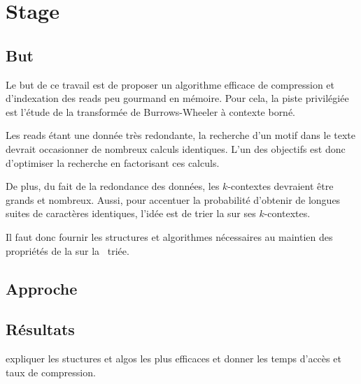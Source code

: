 \section{Stage}

\subsection{But}
Le but de ce travail est de proposer un algorithme efficace de compression et d'indexation des reads peu gourmand en mémoire. Pour cela, la piste privilégiée est l'étude de la transformée de Burrows-Wheeler à contexte borné. 

Les reads étant une donnée très redondante, la recherche d'un motif dans le texte devrait occasionner de nombreux calculs identiques. L'un des objectifs est donc d'optimiser la recherche en factorisant ces calculs. 

De plus, du fait de la redondance des données, les $k$-contextes devraient être grands et nombreux. Aussi, pour accentuer la probabilité d'obtenir de longues suites de caractères identiques, l'idée est de trier la \kbwt sur ses $k$-contextes. 

Il faut donc fournir les structures et algorithmes nécessaires au maintien des propriétés de la \bwt sur la \kbwt \ triée.


\subsection{Approche}



\subsection{Résultats} 

expliquer les stuctures et algos les plus efficaces et donner les temps d'accès et taux de compression.
